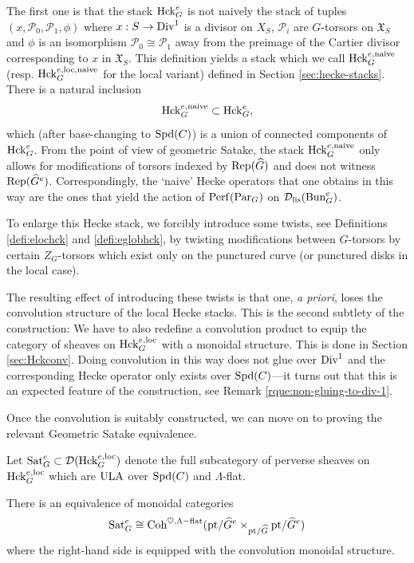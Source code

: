 The first one is that the stack $\mathrm{Hck}_{G}^e$ is not naively the stack of tuples $(x, \mathcal{P}_0, \mathcal{P}_1, \phi)$ where $x : S \to \mathrm{Div}^1$ is a divisor on $X_S$, $\mathcal{P}_i$ are $G$-torsors on $\mathfrak{X}_{S}$ and $\phi$ is an isomorphism $\mathcal{P}_0 \cong \mathcal{P}_1$ away from the preimage of the Cartier divisor corresponding to $x$ in $\mathfrak{X}_{S}$. This definition yields a stack which we call $\mathrm{Hck}_{G}^{e, \textnormal{naive}}$ (resp. $\mathrm{Hck}_{G}^{e,\mathrm{loc}, \textnormal{naive}}$ for the local variant) defined in Section \ref{sec:hecke-stacks}. There is a natural inclusion 
$$\mathrm{Hck}_{G}^{e, \textnormal{naive}} \subset \mathrm{Hck}_{G}^{e},$$
which (after base-changing to $\mathrm{Spd}(C)$) is a union of connected components of $\mathrm{Hck}_{G}^e$. From the point of view of geometric Satake, the stack $\mathrm{Hck}_{G}^{e, \textnormal{naive}}$ only allows for modifications of torsors indexed by $\mathrm{Rep}(\widehat{G})$ and does not witness $\mathrm{Rep}(\widehat{G}^e)$. Correspondingly, the `naive' Hecke operators that one obtains in this way are the ones that yield the action of $\mathrm{Perf}(\mathrm{Par}_G)$ on $\mathcal{D}_{\mathrm{lis}}(\mathrm{Bun}_G^e)$. 

To enlarge this Hecke stack, we forcibly introduce some twists, see Definitions \ref{defi:elochck} and \ref{defi:eglobhck}, by twisting modifications between $G$-torsors by certain $Z_G$-torsors which exist only on the punctured curve (or punctured disks in the local case). 

The resulting effect of introducing these twists is that one, \emph{a priori}, loses the convolution structure of the local Hecke stacks. This is the second subtlety of the construction: We have to also redefine a convolution product to equip the category of sheaves on $\mathrm{Hck}_{G}^{e, \mathrm{loc}}$ with a monoidal structure. This is done in Section \ref{sec:Hckconv}. Doing convolution in this way does not glue over $\mathrm{Div}^1$ and the corresponding Hecke operator only exists over $\mathrm{Spd}(C)$---it turns out that this is an expected feature of the construction, see Remark \ref{rque:non-gluing-to-div-1}. 

Once the convolution is suitably constructed, we can move on to proving the relevant Geometric Satake equivalence. 
\begin{defi}
    Let $\mathrm{Sat}_G^e \subset \mathcal{D}(\mathrm{Hck}^{e, \mathrm{loc}}_G)$ denote the full subcategory of perverse sheaves on $\mathrm{Hck}^{e, \mathrm{loc}}_G$ which are $\textnormal{ULA}$ over $\mathrm{Spd}(C)$ and $\Lambda$-flat. 
\end{defi}

\begin{thm}
    There is an equivalence of monoidal categories
    $$\mathrm{Sat}_G^e \cong \mathrm{Coh}^{\heartsuit, \Lambda-\textnormal{flat}}(\mathrm{pt}/\widehat{G}^e \times_{\mathrm{pt}/\widehat{G}} \mathrm{pt}/\widehat{G}^e)$$
    where the right-hand side is equipped with the convolution monoidal structure. 
\end{thm}

